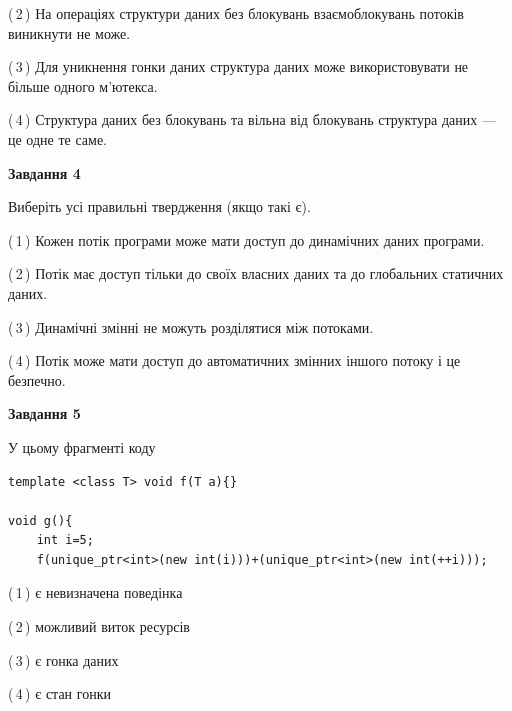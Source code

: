 \documentclass[12pt, ukrainian]{article}
\begin{document}
\begin {large}
{(\,2\,) На операціях структури даних без блокувань взаємоблокувань потоків виникнути не може.%

(\,3\,) Для уникнення гонки даних структура даних може використовувати не більше одного м’ютекса.%

(\,4\,) Структура даних без блокувань та вільна від блокувань структура даних --- це одне те саме.%



\begin{center}
\textbf{Завдання 4}
\end{center}
Виберіть усі правильні твердження (якщо такі є).\par
\vspace{2mm}

(\,1\,) Кожен потік програми може мати доступ до динамічних даних програми.%

(\,2\,) Потік має доступ тільки до своїх власних даних та до глобальних статичних даних.%

(\,3\,) Динамічні змінні не можуть розділятися між потоками.%

(\,4\,) Потік може мати доступ до автоматичних змінних іншого потоку і це безпечно.%



\begin{center}
\textbf{Завдання 5}
\end{center}
У цьому фрагменті коду
\begin{verbatim}
template <class T> void f(T a){}

void g(){
    int i=5;
    f(unique_ptr<int>(new int(i)))+(unique_ptr<int>(new int(++i)));
\end{verbatim}
(\,1\,) є невизначена поведінка%

(\,2\,) можливий виток ресурсів%

(\,3\,) є гонка даних%

(\,4\,) є стан гонки%


}
\end {large}
\end{document}
